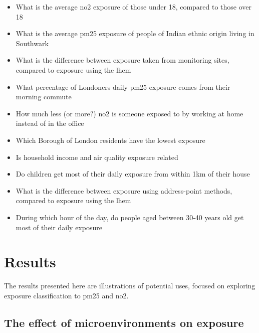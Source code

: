 \begin{itemize}
\item What is the average \gls{no2} exposure of those under 18, compared to those over 18
\item What is the average \gls{pm25} exposure of people of Indian ethnic origin living in Southwark
\item What is the difference between exposure taken from monitoring sites, compared to exposure using the \gls{lhem}
\item What percentage of Londoners daily \gls{pm25} exposure comes from their morning commute
\item How much less (or more?) \gls{no2} is someone exposed to by working at home instead of in the office
\item Which Borough of London residents have the lowest exposure
\item Is household income and air quality exposure related
\item Do children get most of their daily exposure from within 1km of their house
\item What is the difference between exposure using address-point methods, compared to exposure using the \gls{lhem}
\item During which hour of the day, do people aged between 30-40 years old get most of their daily exposure
\end{itemize}

\newpage

\section{Results}
\label{sec:2results}

The results presented here are illustrations of potential uses, focused on exploring exposure classification to \gls{pm25} and \gls{no2}.

\subsection{The effect of microenvironments on exposure}
\label{subsec:time_exposure_microenvironments}


